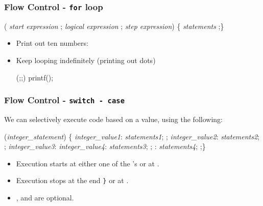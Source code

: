 \documentclass[smaller,handout,table]{beamer}
\begin{document}
\begin{frame}[fragile]
\frametitle{Flow Control - {\tt for} loop}
\begin{block}{}
\begin{semiverbatim}
    ( \emph{start expression} ;
         \emph{logical expression} ;
         \emph{step expression})
         \{ \emph{statements} ;\}
\end{semiverbatim}
\end{block}
\begin{itemize}
\item Print out ten numbers:
\item Keep looping indefinitely (printing out dots)
\begin{semiverbatim}
    (;;) printf();
\end{semiverbatim}
\end{itemize}
\end{frame}

\begin{frame}[fragile]
\frametitle{Flow Control - \tt switch - case}
We can selectively execute code based on a value, using the following:
\begin{block}{}
\begin{semiverbatim}
    (\emph{integer\_statement}) \{
    \emph{integer\_value1}: \emph{statements1}; ;
    \emph{integer\_value2}: \emph{statements2}; ;
    \emph{integer\_value3}:
    \emph{integer\_value4}: \emph{statements3}; ;   
   : \emph{statements4}; ;\}
\end{semiverbatim}
\end{block}
\begin{itemize}
\item Execution starts at either one of the 's or at .
\item Execution stops at the end {\tt\}} or at .
\item {},  and  are optional.
\end{itemize}
\end{frame}
\end{document}
